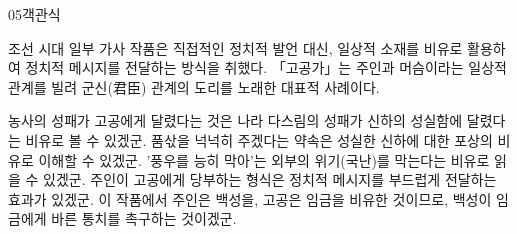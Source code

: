 \documentclass[fs85,seriesWit]{korfarm-base}
\begin{document}
\begin{kfQBlock}{05}{객관식}
\begin{kfEvidence}조선 시대 일부 가사 작품은 직접적인 정치적 발언 대신, 일상적 소재를 비유로 활용하여 정치적 메시지를 전달하는 방식을 취했다. 「고공가」는 주인과 머슴이라는 일상적 관계를 빌려 군신(君臣) 관계의 도리를 노래한 대표적 사례이다.\end{kfEvidence}
\begin{kfChoices}
\kfChoice 농사의 성패가 고공에게 달렸다는 것은 나라 다스림의 성패가 신하의 성실함에 달렸다는 비유로 볼 수 있겠군.
\kfChoice 품삯을 넉넉히 주겠다는 약속은 성실한 신하에 대한 포상의 비유로 이해할 수 있겠군.
\kfChoice '풍우를 능히 막아'는 외부의 위기(국난)를 막는다는 비유로 읽을 수 있겠군.
\kfChoice 주인이 고공에게 당부하는 형식은 정치적 메시지를 부드럽게 전달하는 효과가 있겠군.
\kfChoice 이 작품에서 주인은 백성을, 고공은 임금을 비유한 것이므로, 백성이 임금에게 바른 통치를 촉구하는 것이겠군.
\end{kfChoices}
\end{kfQBlock}

\kfEndMC

\end{document}

